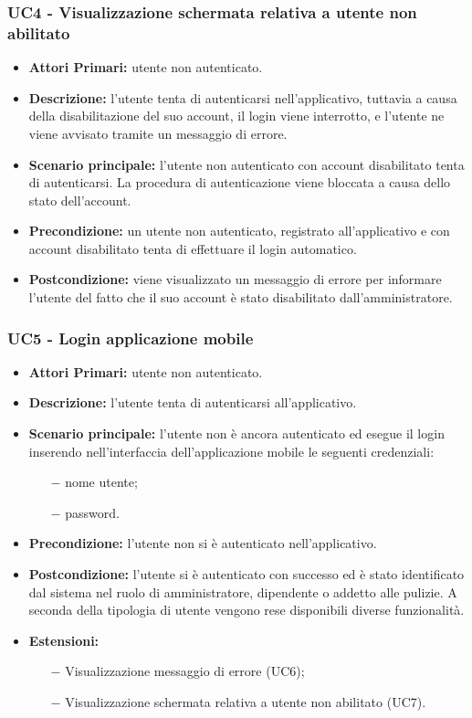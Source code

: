 \subsubsection{ UC4 - Visualizzazione schermata relativa a utente non abilitato}
\begin{itemize}
	\item\textbf{Attori Primari:} utente non autenticato.
	\item\textbf{Descrizione:} l'utente tenta di autenticarsi nell'applicativo, tuttavia a causa della disabilitazione del suo account, il login viene interrotto, e
	l'utente ne viene avvisato tramite un messaggio di errore.
	\item\textbf{Scenario principale:} l’utente non autenticato con account disabilitato tenta di autenticarsi. 
	La procedura di autenticazione viene bloccata a causa dello stato dell'account.
	\item\textbf{Precondizione:} un utente non autenticato, registrato all'applicativo e con account disabilitato tenta di effettuare il login automatico. 
	\item\textbf{Postcondizione:} viene visualizzato un messaggio di errore per informare l'utente del fatto che il suo account è stato disabilitato dall'amministratore.
\end{itemize}

\subsubsection{ UC5 - Login applicazione mobile}
\begin{itemize}
	\item\textbf{Attori Primari:} utente non autenticato.
	\item\textbf{Descrizione:} l’utente tenta di autenticarsi all'applicativo.
	\item\textbf{Scenario principale:} l’utente non è ancora autenticato ed esegue il login inserendo nell'interfaccia dell'applicazione mobile le seguenti credenziali:
	\begin{itemize}
		\item[$-$] nome utente;
		\item[$-$] password.
	\end{itemize}
	\item\textbf{Precondizione:} l’utente non si è autenticato nell'applicativo. 
	\item\textbf{Postcondizione:} l’utente si è autenticato con successo ed è stato identificato dal sistema
	nel ruolo di amministratore, dipendente o addetto alle pulizie. A seconda della tipologia di utente vengono rese
	disponibili diverse funzionalità.
	\item\textbf{Estensioni:}
	\begin{itemize}
		\item[$-$] Visualizzazione messaggio di errore (UC6);
		\item[$-$] Visualizzazione schermata relativa a utente non abilitato (UC7).
	\end{itemize}
\end{itemize}

